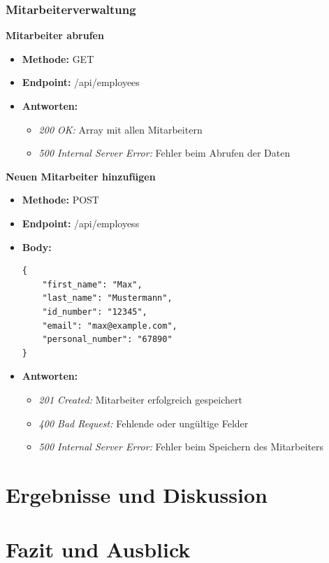 \subsubsection{Mitarbeiterverwaltung}

\textbf{Mitarbeiter abrufen}
\begin{itemize}
    \item \textbf{Methode: }GET 
    \item \textbf{Endpoint: }/api/employees
    \item \textbf{Antworten: }
    \begin{itemize}
        \item \textit{200 OK: }Array mit allen Mitarbeitern
        \item \textit{500 Internal Server Error: }Fehler beim Abrufen der Daten
    \end{itemize}
\end{itemize}

\textbf{Neuen Mitarbeiter hinzufügen}
\begin{itemize}
    \item \textbf{Methode: }POST 
    \item \textbf{Endpoint: }/api/employess  
    \item \textbf{Body: } \begin{verbatim}
{
    "first_name": "Max",
    "last_name": "Mustermann",
    "id_number": "12345",
    "email": "max@example.com",
    "personal_number": "67890"
}
    \end{verbatim}
    \item \textbf{Antworten: }
    \begin{itemize}
        \item \textit{201 Created: }Mitarbeiter erfolgreich gespeichert
        \item \textit{400 Bad Request: }Fehlende oder ungültige Felder
        \item \textit{500 Internal Server Error: }Fehler beim Speichern des Mitarbeiters
    \end{itemize}
\end{itemize}


\section{Ergebnisse und Diskussion}
\label{sec:ergebnisse_und_diskussion}



\section{Fazit und Ausblick}
\label{sec:fazit_und_ausblick}


